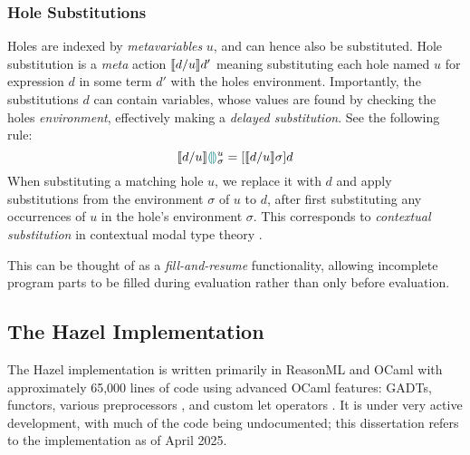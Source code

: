 \subsubsection{Hole Substitutions}\label{sec:HoleSubstitution}
Holes are indexed by \textit{metavariables} $u$, and can hence also be substituted. Hole substitution is a \textit{meta} action $\llbracket d/u \rrbracket d'$ meaning substituting each hole named $u$ for expression $d$ in some term $d'$ with the holes environment. Importantly, the substitutions $d$ can contain variables, whose values are found by checking the holes \textit{environment}, effectively making a \textit{delayed substitution}. See the following rule:
 \[\llbracket d/u \rrbracket {\color{teal}\llparenthesis}  {\color{teal}\rrparenthesis}^u_\sigma = [\llbracket d/u \rrbracket \sigma]d\]
When substituting a matching hole $u$, we replace it with $d$ and apply substitutions from the environment $\sigma$ of $u$ to $d$, after first substituting any occurrences of $u$ in the hole's environment $\sigma$. This corresponds to \textit{contextual substitution} in contextual modal type theory \cite{CMTT}.
 
 This can be thought of as a \textit{fill-and-resume} functionality, allowing incomplete program parts to be filled during evaluation rather than only before evaluation.

\subsection{The Hazel Implementation}\label{sec:HazelImplementation}
The Hazel implementation \cite{HazelCode} is written primarily in ReasonML and OCaml with approximately 65,000 lines of code using advanced OCaml features: GADTs, functors, various preprocessors \cite[ch. 9, 10, 25]{RealWorldOCaml}, and custom let operators \cite{CustomLetOperators}. It is under very active development, with much of the code being undocumented; this dissertation refers to the implementation as of April 2025.

